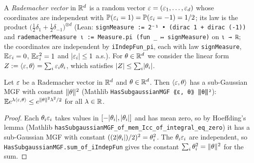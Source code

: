 \begin{definition}\label{def:ps_rademacher}
\leanok
A \emph{Rademacher vector} in $\mathbb{R}^d$ is a random vector $\varepsilon = (\varepsilon_1,\dots,\varepsilon_d)$ whose
coordinates are independent with $\mathbb{P}(\varepsilon_i = 1) = \mathbb{P}(\varepsilon_i = -1) = 1/2$; its law is the
product $\big(\frac12\delta_{1} + \frac12\delta_{-1}\big)^{\otimes d}$
(Lean: \texttt{signMeasure := 2⁻¹ • (dirac 1 + dirac (-1))} and
\texttt{rademacherMeasure ι := Measure.pi (fun \_ ↦ signMeasure)} on \texttt{ι → ℝ}; the
coordinates are independent by \texttt{iIndepFun\_pi}, each with law \texttt{signMeasure},
$\mathbb{E}\varepsilon_i = 0$, $\mathbb{E}\varepsilon_i^2 = 1$ and $\lvert \varepsilon_i \rvert \le 1$ a.s.).
For $\theta \in \mathbb{R}^d$ we consider the linear form $Z := \langle \varepsilon, \theta \rangle = \sum_i\varepsilon_i\theta_i$,
which satisfies $\lvert Z \rvert \le \sum_i\lvert \theta_i \rvert$.
\end{definition}

\begin{lemma}\label{lem:rademacher_linear_subgaussian}
\leanok
{}
Let $\varepsilon$ be a Rademacher vector in $\mathbb{R}^d$ and $\theta \in \mathbb{R}^d$. Then $\langle \varepsilon, \theta \rangle$ has a
sub-Gaussian MGF with constant $\lVert \theta \rVert^2$ (Mathlib
\texttt{HasSubgaussianMGF ⟪ε, θ⟫ ‖θ‖²}): $\mathbb{E} e^{\lambda\langle \varepsilon, \theta \rangle} \le e^{\lVert \theta \rVert^2\lambda^2/2}$
for all $\lambda\in\mathbb{R}$.
\end{lemma}

\begin{proof}
\leanok
{}
Each $\theta_i\varepsilon_i$ takes values in $[-\lvert \theta_i \rvert, \lvert \theta_i \rvert]$ and has mean zero, so
by Hoeffding's lemma (Mathlib \texttt{hasSubgaussianMGF\_of\_mem\_Icc\_of\_integral\_eq\_zero})
it has a sub-Gaussian MGF with constant $((2\lvert \theta_i \rvert)/2)^2 = \theta_i^2$. The
$\theta_i\varepsilon_i$ are independent, so \texttt{HasSubgaussianMGF.sum\_of\_iIndepFun} gives the
constant $\sum_i\theta_i^2 = \lVert \theta \rVert^2$ for the sum.
\end{proof}


